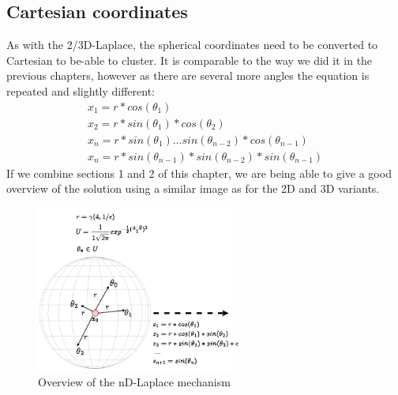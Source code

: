 \subsection{Cartesian coordinates}
As with the 2/3D-Laplace, the spherical coordinates need to be converted to Cartesian to be-able to cluster.
It is comparable to the way we did it in the previous chapters, however as there are several more angles the equation is repeated and slightly different:
\begin{align*}
  x_1 = r * cos (\theta_1)                                          \\
  x_2 = r * sin (\theta_1) * cos (\theta_2)                         \\
  x_{n} = r * sin(\theta_1) … sin(\theta_{n-2}) *cos (\theta_{n-1}) \\
  x_n = r * sin(\theta_{n-1}) * sin(\theta_{n-2}) * sin(\theta_{n-1})
\end{align*}
If we combine sections 1 and 2 of this chapter, we are being able to give a good overview of the solution using a similar image as for the 2D and 3D variants.
\begin{figure}
  \label{fig:nd-laplace-overview}
  \includegraphics[width=0.6\textwidth]{TheorethicalFramework/ND-Laplace/Images/nd_laplace.png}
  \caption{Overview of the nD-Laplace mechanism}
\end{figure}

